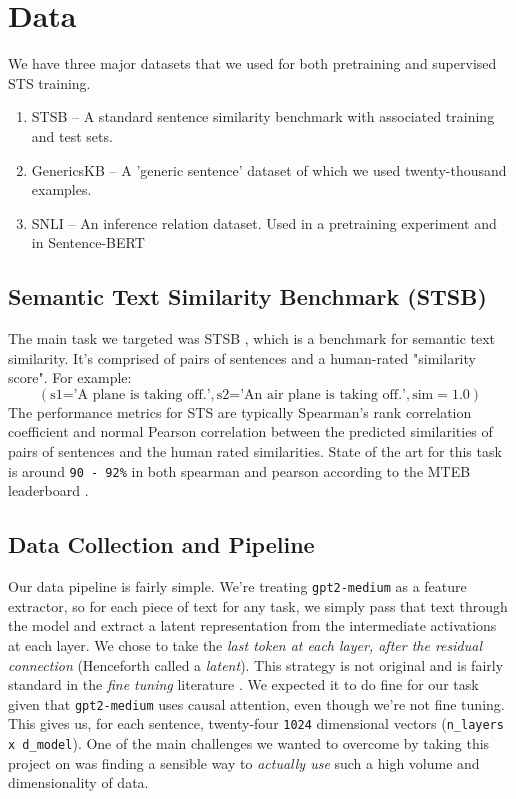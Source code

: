 \documentclass[14pt]{article}
\begin{document}
\section{Data}
We have three major datasets that we used for both pretraining and supervised STS training.
\begin{enumerate}
    \item STSB \cite{STS} -- A standard sentence similarity benchmark with associated training and test sets.
    \item GenericsKB \cite{bhakthavatsalam2020genericskbknowledgebasegeneric} -- A 'generic sentence' dataset of which we used twenty-thousand examples.
    \item SNLI \cite{snli} -- An inference relation dataset. Used in a pretraining experiment and in Sentence-BERT \cite{reimers2019sentencebertsentenceembeddingsusing}
\end{enumerate}

\subsection{Semantic Text Similarity Benchmark (STSB)} \label{STS-section}
The main task we targeted was STSB \cite{STS}, which is a benchmark for semantic text similarity. It's comprised of pairs of sentences and a human-rated "similarity score". For example:
$$
(\text{s1='A plane is taking off.'}, \text{s2='An air plane is taking off.'}, \text{sim}=1.0)
$$
The performance metrics for STS are typically Spearman's rank correlation coefficient and normal Pearson correlation between the predicted similarities of pairs of sentences and the human rated similarities. State of the art for this task is around \verb|90 - 92%| in both spearman and pearson according to the MTEB leaderboard \cite{muennighoff2022mteb}.

\subsection{Data Collection and Pipeline} \label{latent}
Our data pipeline is fairly simple. We're treating \verb|gpt2-medium| as a feature extractor, so for each piece of text for any task, we simply pass that text through the model and extract a latent representation from the intermediate activations at each layer. We chose to take the \textit{last token at each layer, after the residual connection} (Henceforth called a \textit{latent}). This strategy is not original and is fairly standard in the \textit{fine tuning} literature \cite{LLMEmbed}. We expected it to do fine for our task given that \verb|gpt2-medium| uses causal attention, even though we're not fine tuning. This gives us, for each sentence, twenty-four \verb|1024| dimensional vectors (\verb|n_layers x d_model|). One of the main challenges we wanted to overcome by taking this project on was finding a sensible way to \textit{actually use} such a high volume and dimensionality of data.
\end{document}
